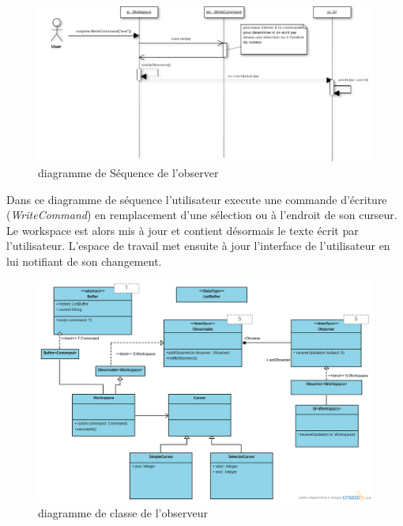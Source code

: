 \documentclass[pdftex,12pt,a4paper]{article}
\begin{document}
      
       \begin{figure}[htb]
        	\begin{center}
        	\includegraphics[width=1.0\textwidth]{./seqObserver.png}\caption{diagramme de Séquence de l'observer}
             \end{center}
      	\end{figure}
        
Dans ce diagramme de séquence l'utilisateur execute une commande d'écriture (\emph{WriteCommand}) en remplacement d'une sélection ou à l'endroit de son curseur. Le workspace est alors mis à jour et contient désormais le texte écrit par l'utilisateur. L'espace de travail met ensuite à jour l'interface de l'utilisateur en lui notifiant de son changement.      
        
        
          \begin{figure}
        	\begin{center}
\includegraphics[width=1.0\textwidth]{./obsgl.png}\caption{diagramme de classe de l'observeur}
             \end{center}
      	\end{figure}
        
\end{document}
